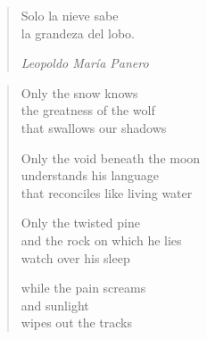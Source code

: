 

\begin{quote}
Solo la nieve sabe\\
la grandeza del lobo.

\hspace{2em}\textit{Leopoldo María Panero}
\end{quote}

\begin{verse}
Only the snow knows\\
the greatness of the wolf\\
that swallows our shadows

Only the void beneath the moon\\
understands his language\\
that reconciles like living water

Only the twisted pine\\
and the rock on which he lies\\
watch over his sleep

while the pain screams\\
and sunlight\\
wipes out the tracks
\end{verse}
